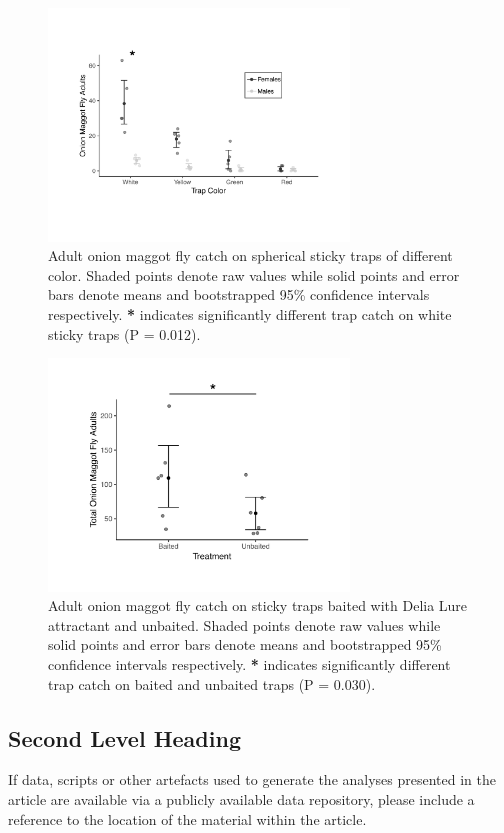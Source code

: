 \documentclass[alpha-refs]{wiley-article}
\begin{document}
\begin{figure}[bt]
\centering
\includegraphics[width = 8cm]{figures/publication/figure-3.pdf}
\caption{Adult onion maggot fly catch on spherical sticky traps of different color.  Shaded points denote raw values while solid points and error bars denote means and bootstrapped 95\% confidence intervals respectively.  \textbf{*} indicates significantly different trap catch on white sticky traps (P = 0.012).}
\label{fig:figure3}
\end{figure}


\begin{figure}[bt]
\centering
\includegraphics[width = 8cm]{figures/publication/figure-4.pdf}
\caption{Adult onion maggot fly catch on sticky traps baited with Delia Lure attractant and unbaited.  Shaded points denote raw values while solid points and error bars denote means and bootstrapped 95\% confidence intervals respectively.  \textbf{*} indicates significantly different trap catch on baited and unbaited traps (P = 0.030). }
\label{fig:figure4}
\end{figure}



\subsection{Second Level Heading}
If data, scripts or other artefacts used to generate the analyses presented in the article are available via a publicly available data repository, please include a reference to the location of the material within the article.
\end{document}
